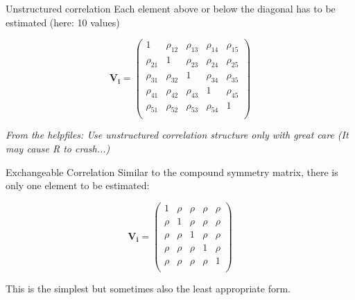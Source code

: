 \documentclass{beamer}
\newenvironment{VerbatimIN}
 {\VerbatimEnvironment
  \begin{tcolorbox}[
    breakable,
    colback=lightgray,
    spartan
  ]%
  \begin{Verbatim}}
 {\end{Verbatim}\end{tcolorbox}}
\begin{document}

\begin{frame}{Unstructured correlation}
Each element above or below the diagonal has to be estimated (here: 10 values)
\vspace{0.3cm}

\begin{equation*}
\mathbf{V_i} = \left( \begin{array}{ccccc}
1 & \rho_{12} & \rho_{13} & \rho_{14} & \rho_{15} \\
\rho_{21} & 1 & \rho_{23} & \rho_{24} & \rho_{25} \\
\rho_{31} & \rho_{32} & 1 & \rho_{34} & \rho_{35} \\
\rho_{41} & \rho_{42} & \rho_{43} & 1 & \rho_{45} \\
\rho_{51} & \rho_{52} & \rho_{53} & \rho_{54} & 1 \\
\end{array} \right)
\end{equation*}

\vspace{0.3cm}

\textit{From the helpfiles: Use unstructured correlation structure only with great care (It may cause R to crash...)}
\end{frame}

\begin{frame}{Exchangeable Correlation}
Similar to the compound symmetry matrix, there is only one element to be estimated:
\vspace{0.3cm}

\begin{equation*}
\mathbf{V_i} = \left( \begin{array}{ccccc}
1 & \rho & \rho & \rho & \rho \\
\rho & 1 & \rho & \rho & \rho \\
\rho & \rho & 1 & \rho & \rho \\
\rho & \rho & \rho & 1 & \rho \\
\rho & \rho & \rho & \rho & 1 \\
\end{array} \right)
\end{equation*}
\vspace{0.3cm}

This is the simplest but sometimes also the least appropriate form.
\end{frame}
\end{document}
